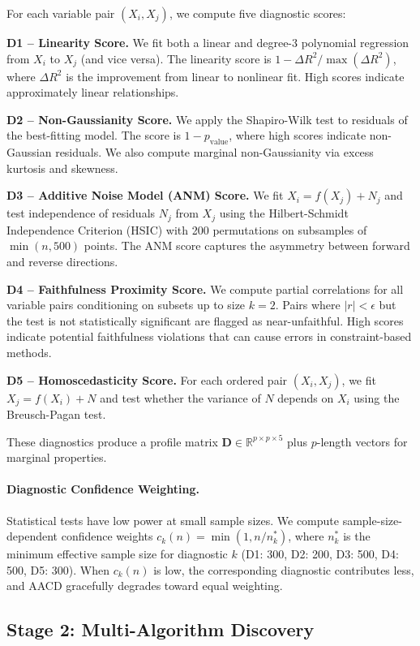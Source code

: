 \documentclass{article}
\newcommand{\aacd}{\textsc{AACD}}
\begin{document}
For each variable pair $(X_i, X_j)$, we compute five diagnostic scores:

\textbf{D1 -- Linearity Score.} We fit both a linear and degree-3 polynomial regression from $X_i$ to $X_j$ (and vice versa). The linearity score is $1 - \Delta R^2 / \max(\Delta R^2)$, where $\Delta R^2$ is the improvement from linear to nonlinear fit. High scores indicate approximately linear relationships.

\textbf{D2 -- Non-Gaussianity Score.} We apply the Shapiro-Wilk test to residuals of the best-fitting model. The score is $1 - p_{\text{value}}$, where high scores indicate non-Gaussian residuals. We also compute marginal non-Gaussianity via excess kurtosis and skewness.

\textbf{D3 -- Additive Noise Model (ANM) Score.} We fit $X_i = f(X_j) + N_j$ and test independence of residuals $N_j$ from $X_j$ using the Hilbert-Schmidt Independence Criterion (HSIC) with 200 permutations on subsamples of $\min(n, 500)$ points. The ANM score captures the asymmetry between forward and reverse directions.

\textbf{D4 -- Faithfulness Proximity Score.} We compute partial correlations for all variable pairs conditioning on subsets up to size $k=2$. Pairs where $|r| < \epsilon$ but the test is not statistically significant are flagged as near-unfaithful. High scores indicate potential faithfulness violations that can cause errors in constraint-based methods.

\textbf{D5 -- Homoscedasticity Score.} For each ordered pair $(X_i, X_j)$, we fit $X_j = f(X_i) + N$ and test whether the variance of $N$ depends on $X_i$ using the Breusch-Pagan test.

These diagnostics produce a profile matrix $\mathbf{D} \in \mathbb{R}^{p \times p \times 5}$ plus $p$-length vectors for marginal properties.

\paragraph{Diagnostic Confidence Weighting.} Statistical tests have low power at small sample sizes. We compute sample-size-dependent confidence weights $c_k(n) = \min(1, n / n_k^*)$, where $n_k^*$ is the minimum effective sample size for diagnostic $k$ (D1: 300, D2: 200, D3: 500, D4: 500, D5: 300). When $c_k(n)$ is low, the corresponding diagnostic contributes less, and \aacd{} gracefully degrades toward equal weighting.

\subsection{Stage 2: Multi-Algorithm Discovery}
\end{document}
